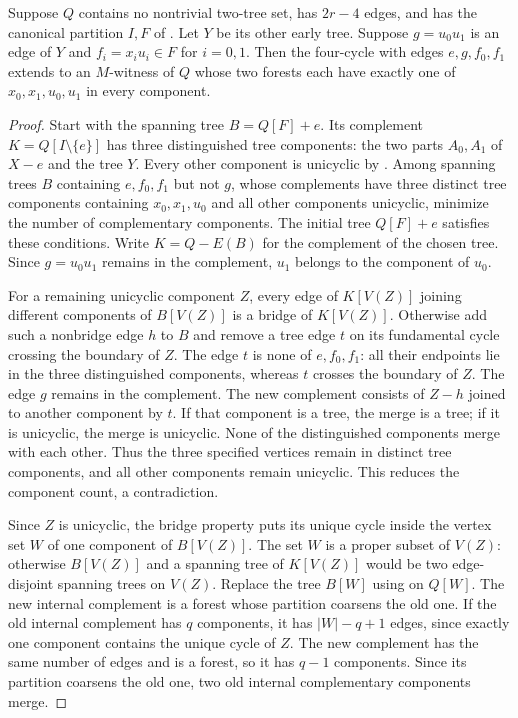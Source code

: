 \documentclass[USenglish, a4paper, thm-restate,numberwithinsect, cleveref]{lipics-v2021}
\begin{document}
\begin{lemma}\label{lem:characterization-protected-extension}
Suppose $Q$ contains no nontrivial two-tree set, has $2r-4$ edges,
and has the canonical partition $I,F$ of
. Let $Y$ be its other early tree.
Suppose $g=u_0u_1$ is an edge of $Y$ and
$f_i=x_iu_i\in F$ for $i=0,1$. Then the four-cycle with edges
$e,g,f_0,f_1$ extends to an $M$-witness of $Q$ whose two forests
each have exactly one of $x_0,x_1,u_0,u_1$ in every component.
\end{lemma}
\begin{proof}
Start with the spanning tree $B=Q[F]+e$. Its complement
$K=Q[I\setminus\{e\}]$
has three distinguished tree components: the two parts $A_0,A_1$
of $X-e$ and the tree $Y$. Every other component is unicyclic by
. Among spanning trees $B$
containing $e,f_0,f_1$ but not $g$, whose complements have three
distinct tree components containing $x_0,x_1,u_0$ and all other
components unicyclic, minimize the number of complementary components.
The initial tree $Q[F]+e$ satisfies these conditions. Write
$K=Q-E(B)$ for the complement of the chosen tree. Since $g=u_0u_1$
remains in the complement, $u_1$ belongs to the component of $u_0$.

For a remaining unicyclic component $Z$, every edge of $K[V(Z)]$
joining different components of $B[V(Z)]$ is a bridge of $K[V(Z)]$.
Otherwise add such a nonbridge edge $h$ to $B$ and remove a tree
edge $t$ on its fundamental cycle crossing the boundary of $Z$.
The edge $t$ is none of $e,f_0,f_1$: all their endpoints lie in the
three distinguished components, whereas $t$ crosses the boundary of
$Z$. The edge $g$ remains in the complement. The new complement consists of $Z-h$ joined to
another component by $t$. If that component is a tree, the merge
is a tree; if it is unicyclic, the merge is unicyclic. None of the
distinguished components merge with each other. Thus the three specified
vertices remain in distinct tree components, and all other components
remain unicyclic. This reduces the component count, a
contradiction.

Since $Z$ is unicyclic, the bridge property puts its unique cycle
inside the vertex set $W$ of one component of $B[V(Z)]$.
The set $W$ is a proper subset of $V(Z)$: otherwise
$B[V(Z)]$ and a spanning tree of $K[V(Z)]$ would be two edge-disjoint spanning
trees on $V(Z)$. Replace the tree $B[W]$ using
 on $Q[W]$. The new internal complement
is a forest whose partition coarsens the old one. If the old internal
complement has $q$ components, it has $|W|-q+1$ edges, since exactly
one component contains the unique cycle of $Z$. The new complement has
the same number of edges and is a forest, so it has $q-1$ components.
Since its partition coarsens the old one, two old internal complementary
components merge.


\end{proof}
\end{document}
